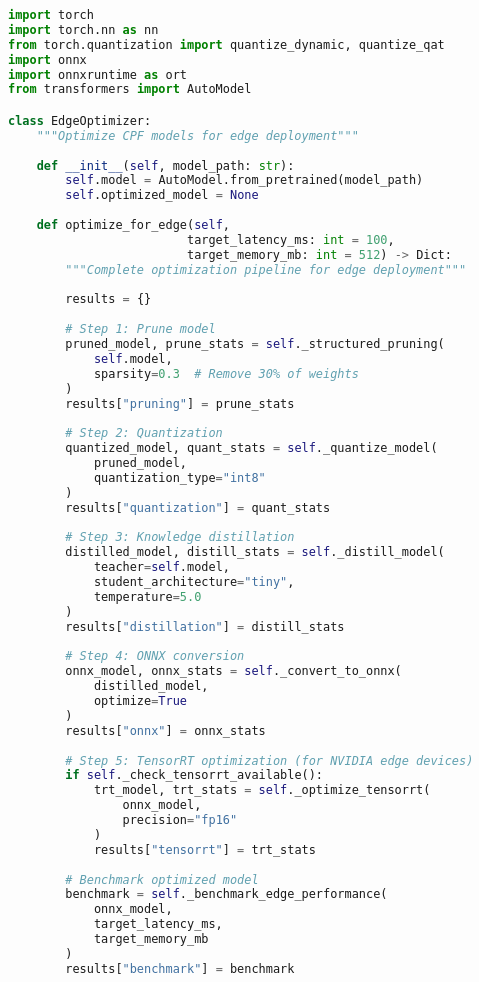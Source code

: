 \documentclass[11pt,a4paper]{article}
\begin{document}
\begin{lstlisting}[language=Python, caption=Edge Optimization Pipeline]
import torch
import torch.nn as nn
from torch.quantization import quantize_dynamic, quantize_qat
import onnx
import onnxruntime as ort
from transformers import AutoModel

class EdgeOptimizer:
    """Optimize CPF models for edge deployment"""
    
    def __init__(self, model_path: str):
        self.model = AutoModel.from_pretrained(model_path)
        self.optimized_model = None
        
    def optimize_for_edge(self, 
                         target_latency_ms: int = 100,
                         target_memory_mb: int = 512) -> Dict:
        """Complete optimization pipeline for edge deployment"""
        
        results = {}
        
        # Step 1: Prune model
        pruned_model, prune_stats = self._structured_pruning(
            self.model,
            sparsity=0.3  # Remove 30% of weights
        )
        results["pruning"] = prune_stats
        
        # Step 2: Quantization
        quantized_model, quant_stats = self._quantize_model(
            pruned_model,
            quantization_type="int8"
        )
        results["quantization"] = quant_stats
        
        # Step 3: Knowledge distillation
        distilled_model, distill_stats = self._distill_model(
            teacher=self.model,
            student_architecture="tiny",
            temperature=5.0
        )
        results["distillation"] = distill_stats
        
        # Step 4: ONNX conversion
        onnx_model, onnx_stats = self._convert_to_onnx(
            distilled_model,
            optimize=True
        )
        results["onnx"] = onnx_stats
        
        # Step 5: TensorRT optimization (for NVIDIA edge devices)
        if self._check_tensorrt_available():
            trt_model, trt_stats = self._optimize_tensorrt(
                onnx_model,
                precision="fp16"
            )
            results["tensorrt"] = trt_stats
        
        # Benchmark optimized model
        benchmark = self._benchmark_edge_performance(
            onnx_model,
            target_latency_ms,
            target_memory_mb
        )
        results["benchmark"] = benchmark
        

\end{lstlisting}
\end{document}
